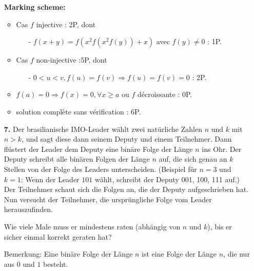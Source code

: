 \documentclass[language=german,style=solution]{smo}
\begin{document}
\begin{enumerate}
\textbf{Marking scheme:}
\begin{itemize}
\item Cas $f$ injective : 2P, dont
\begin{itemize}
\item[-] $f(x+y)=f(x^2f(x^2f(y))+x)$ avec $f(y)\neq 0$ : 1P.
\end{itemize}
\item Cas $f$ non-injective :5P, dont
\begin{itemize}
\item[-] $0<u<v, f(u)=f(v)\Rightarrow f(u)=f(v)=0$ : 2P.
\end{itemize}
\item $f(a)=0\Rightarrow f(x)=0,\forall x\geq a$ ou $f$ décroissante : 0P.
\item solution complète sans vérification : 6P.
\end{itemize}
\newpage

\item[\textbf{7.}] %
Der brasilianische IMO-Leader wählt zwei natürliche Zahlen $n$ und $k$ mit $n>k$, und sagt diese dann seinem Deputy und einem Teilnehmer. Dann flüstert der Leader dem Deputy eine binäre Folge der Länge $n$ ins Ohr. Der Deputy schreibt alle binären Folgen der Länge $n$ auf, die sich genau an $k$ Stellen von der Folge des Leaders unterscheiden. (Beispiel für $n=3$ und $k=1$: Wenn der Leader $101$ wählt, schreibt der Deputy 001, 100, 111 auf.) Der Teilnehmer schaut sich die Folgen an, die der Deputy aufgeschrieben hat. Nun versucht der Teilnehmer, die ursprüngliche Folge vom Leader herauszufinden.
	
Wie viele Male muss er mindestens raten (abhängig von $n$ und $k$), bis er sicher einmal korrekt geraten hat?
	 
Bemerkung: Eine binäre Folge der Länge $n$ ist eine Folge der Länge $n$, die nur aus $0$ und $1$ besteht.


\end{enumerate}
\end{document}
